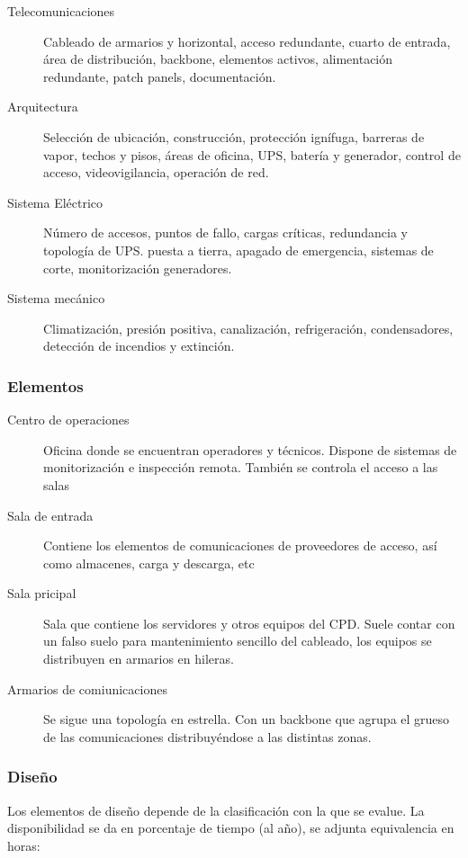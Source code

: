 \begin{description}
    \item[Telecomunicaciones] Cableado de armarios y horizontal, acceso redundante, cuarto de entrada, área de distribución, backbone, elementos activos, alimentación redundante, patch panels, documentación.
    \item[Arquitectura] Selección de ubicación, construcción, protección ignífuga, barreras de vapor, techos y pisos, áreas de oficina, UPS, batería y generador, control de acceso, videovigilancia, operación de red.
    \item[Sistema Eléctrico] Número de accesos, puntos de fallo, cargas críticas, redundancia y topología de UPS. puesta a tierra, apagado de emergencia, sistemas de corte, monitorización generadores.
    \item[Sistema mecánico] Climatización, presión positiva, canalización, refrigeración, condensadores, detección de incendios y extinción.
\end{description}

\subsubsection{Elementos}

\begin{description}
    \item[Centro de operaciones] Oficina donde se encuentran operadores y técnicos. Dispone de sistemas de monitorización e inspección remota. También se controla el acceso a las salas
    \item[Sala de entrada] Contiene los elementos de comunicaciones de proveedores de acceso, así como almacenes, carga y descarga, etc
    \item[Sala pricipal] Sala que contiene los servidores y otros equipos del CPD. Suele contar con un falso suelo para mantenimiento sencillo del cableado, los equipos se distribuyen en armarios en hileras.
    \item[Armarios de comiunicaciones] Se sigue una topología en estrella. Con un backbone que agrupa el grueso de las comunicaciones distribuyéndose a las distintas zonas.
\end{description}

\subsubsection{Diseño}
    Los elementos de diseño depende de la clasificación con la que se evalue. La disponibilidad se da en porcentaje de tiempo (al año), se adjunta equivalencia en horas:

